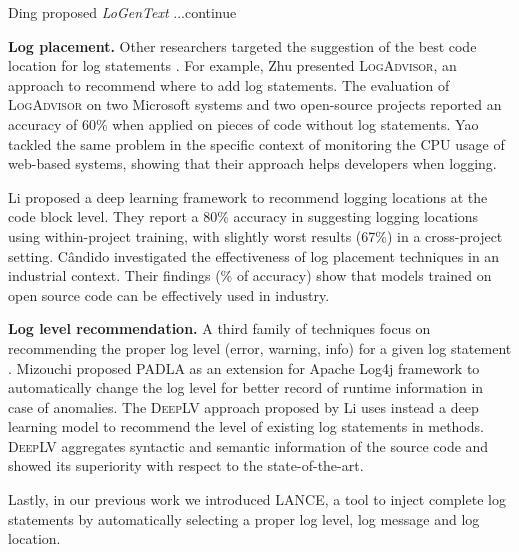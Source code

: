 Ding \etal proposed \textit{LoGenText} \cite{ding2022logentext} ...continue

 \smallskip 

\textbf{Log placement.} Other researchers targeted the suggestion of the best code location for log statements \cite{jia2018smartlog,li2018studying,li2020towards}. For example, Zhu \etal \cite{zhu2015learning} presented \textsc{LogAdvisor}, an approach to recommend where to add log statements. The evaluation of \textsc{LogAdvisor} on two Microsoft systems and two open-source projects reported an accuracy of 60\% when applied on pieces of code without log statements.
Yao \etal \cite{yao2018log4perf} tackled the same problem in the specific context of monitoring the CPU usage of web-based systems, showing that their approach helps developers when logging.

Li \etal \cite{li2020shall} proposed a deep learning framework to recommend logging locations at the code block level. They report a 80\% accuracy in suggesting logging locations using within-project training, with slightly worst results (67\%) in a cross-project setting. C\^andido \etal \cite{candido2021exploratory} investigated the effectiveness of log placement techniques in an industrial context. Their findings (\% of accuracy) show that models trained on open source code can be effectively used in industry. \smallskip 

\textbf{Log level recommendation.} A third family of techniques focus on recommending the proper log level (\eg error, warning, info) for a given log statement \cite{yuan2012characterizing,oliner2012advances}. Mizouchi \etal \cite{mizouchi2019padla} proposed \textsc{PADLA} as an extension for Apache Log4j framework to automatically change the log level for better record of runtime information in case of anomalies. 
The \textsc{DeepLV} approach proposed by Li \etal \cite{li2021deeplv} uses instead a deep learning model to recommend the level of existing log statements in methods. \textsc{DeepLV} aggregates syntactic and semantic information of the source code and showed its superiority with respect to the state-of-the-art. 

Lastly, in our previous work \cite{mastropaolo2022using} we introduced \textsc{LANCE}, a tool to inject complete log statements by automatically selecting a proper log level, log message and log location. 

